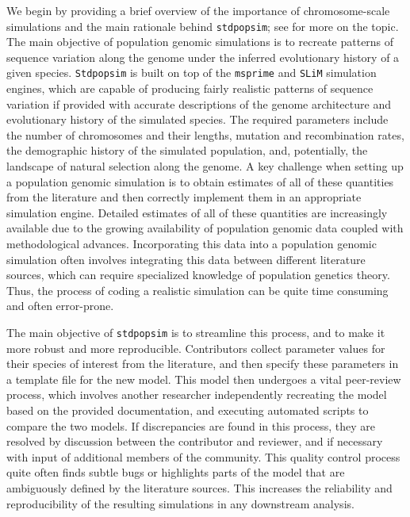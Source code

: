 \documentclass[hidelinks]{article}
\newcommand{\Stdpopsim}{\texttt{Stdpopsim}\xspace}
\newcommand{\stdpopsim}{\texttt{stdpopsim}\xspace}
\begin{document}
We begin by providing a brief overview of the importance of chromosome-scale simulations and the main rationale behind \stdpopsim;
see \citet{Adrion2020} for more on the topic.
The main objective of population genomic simulations is to recreate 
patterns of sequence variation along the genome under 
the inferred evolutionary history of a given species.
\Stdpopsim is built on top of the
\texttt{msprime} \citep{Kelleher2016,Nelson2020,Baumdicker2022}
and \texttt{SLiM} \citep{Haller2019} simulation engines,
which are capable of producing fairly realistic patterns of sequence variation
if provided with accurate descriptions of the genome architecture
and evolutionary history of the simulated species.
The required parameters include the number of chromosomes and their lengths,
mutation and recombination rates, the demographic history of the simulated population,
and, potentially, the landscape of natural selection along the genome.
A key challenge when setting up a population genomic simulation is to
obtain estimates of all of these quantities from the literature
and then correctly implement them in an appropriate simulation engine.
Detailed estimates of all of these quantities are increasingly available
due to the growing availability of population genomic data
coupled with methodological advances. Incorporating this data
into a population genomic simulation often involves 
integrating this data between different literature sources, which can
require specialized knowledge of population genetics theory.
Thus, the process of coding a realistic simulation can be quite time consuming and often error-prone.

The main objective of \stdpopsim is to streamline this process,
and to make it more robust and more reproducible.
Contributors collect parameter values for their species of interest from the literature,
and then specify these parameters in a template file for the new model.
This model then undergoes a vital peer-review process,
which involves another researcher independently recreating the model based on the provided documentation,
and executing automated scripts to compare the two models.
If discrepancies are found in this process, they are resolved by discussion between the contributor and reviewer,
and if necessary with input of additional members of the community.
This quality control process quite often finds subtle bugs \citep[e.g., as in][]{Ragsdale2020}
or highlights parts of the model that are ambiguously defined by the literature sources.
This increases the reliability and reproducibility of the resulting simulations in any downstream analysis.
\end{document}
